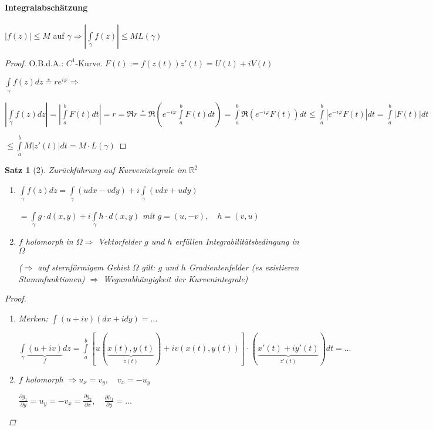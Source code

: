 \documentclass[ngerman,halfparskip]{scrartcl}
\newtheorem{satz}{Satz}[section]
\theoremstyle{definition}
\def\R{\mathbb R}
\begin{document}
\paragraph{Integralabschätzung} $|f(z)|\leq M$ auf $\gamma \Rightarrow |\int\limits_\gamma f(z)|\leq M L(\gamma)$
\begin{proof}
O.B.d.A.: $C^1$-Kurve. $F(t):=f(z(t))z'(t)=U(t)+iV(t)$

$\int\limits_\gamma f(z)dz\overset{*}{=}re^{i\varphi}\Rightarrow$

$|\int\limits_\gamma f(z)dz|=|\int\limits_a^b F(t)dt|=r=\Re r \overset{*}{=}\Re(e^{-i\varphi}\int\limits_a^b F(t)dt)= \int\limits_a^b\Re(e^{-i\varphi}F(t))dt\leq \int\limits_a^b|e^{-i\varphi}F(t)|dt=\int\limits_a^b |F(t)|dt$

$\leq \int\limits _a^b M|z'(t)|dt=M\cdot L(\gamma)$


\end{proof}


\begin{satz}[2]{Zurückführung auf Kurvenintegrale im $\R^2$}
\begin{enumerate}
\item [a)]$\int\limits_\gamma f(z)dz=\int\limits_\gamma (udx-vdy)+i\int\limits_\gamma(vdx+udy)$

$=\int\limits_\gamma g\cdot d(x,y)+ i\int\limits_\gamma h\cdot d(x,y)$ mit $g=(u,-v), \quad h=(v,u)$

\item [b)] $f$ holomorph in $\Omega \Rightarrow$ Vektorfelder $g$ und $h$ erfüllen Integrabilitätsbedingung in $\Omega$

($\Rightarrow$ auf sternförmigem Gebiet $\Omega$ gilt: $g$ und $h$ Gradientenfelder (es existieren Stammfunktionen) $\Rightarrow$ Wegunabhängigkeit der Kurvenintegrale)
\end{enumerate}
\begin{proof}\begin{enumerate}
\item [a)]
Merken: $\int (u+iv)(dx+idy)=\ldots$

$\int\limits_\gamma\underbrace{(u+iv)}_fdz=\int\limits_a^b[ u(\underbrace{x(t),y(t)}_{z(t)})+iv(x(t),y(t)) ]\cdot (\underbrace{x'(t)+iy'(t)}_{z'(t)})dt=\ldots$
\item [a)]$f$ holomorph $\Rightarrow u_x=v_y, \quad v_x=-u_y$

$\frac{\partial g_1}{\partial y}=u_y=-v_x=\frac{\partial g_2}{\partial x}, \quad \frac{\partial h_1}{\partial y}=\ldots$
\end{enumerate}
\end{proof}

\end{satz}
\end{document}
